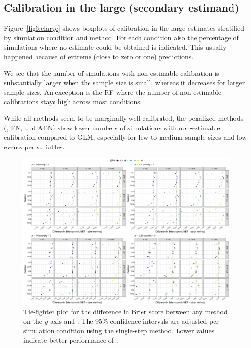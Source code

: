 \begin{subappendices}
\subsection{Calibration in the large (secondary estimand)}

Figure~\ref{fig6:clarge} shows boxplots of calibration in the large estimates
stratified by simulation condition and method. For each condition also the
percentage of simulations where no estimate could be obtained is indicated. This
usually happened because of extreme (close to zero or one) predictions.

We see that the number of simulations with non-estimable calibration is
substantially larger when the sample size is small, whereas it decreases for
larger sample sizes. An exception is the RF where the number of non-estimable
calibrations stays high across most conditions.

While all methods seem to be marginally well calibrated, the penalized methods
(\ainet{}, EN, and AEN) show lower numbers of simulations with non-estimable
calibration compared to GLM, especially for low to medium sample sizes and low
events per variables.

\begin{landscape}
\begin{figure}[!ht]
\center
\includegraphics[width=0.9\linewidth]{images/paper6/figureS1.pdf}
\caption{Tie-fighter plot for the difference in Brier score between any method
  on the $y$-axis and \ainet{}. The 95\% confidence intervals are adjusted per
  simulation condition using the single-step method. Lower values indicate
  better performance of \ainet{}. } \label{fig6:tiebrier}
\end{figure}
\end{landscape}


\end{subappendices}
